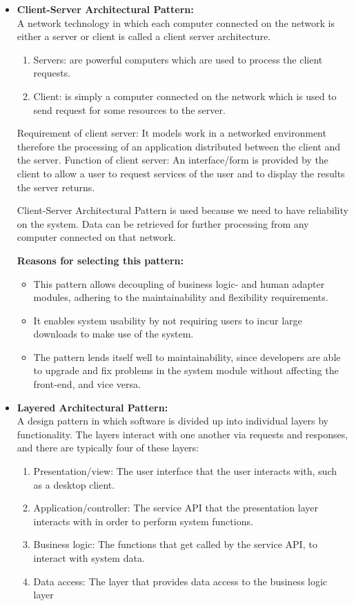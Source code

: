 \documentclass[a4paper,10pt]{article}
\begin{document}
\begin{itemize}
		\item \textbf{Client-Server Architectural Pattern:}\\
			A network technology in which each computer connected on the network is either a server or client is called a client server architecture.
			\begin{enumerate}
				\item Servers: are powerful computers which are used to process the client requests.
				\item Client: is simply a computer connected on the network which is used to send request for some resources to the server.
			\end{enumerate}
			Requirement of client server: It models work in a networked environment therefore the processing of an application distributed between the client and the server.
			Function of client server: An interface/form is provided by the client to allow a user to request services of the user and to display the results the server returns.
			
			Client-Server Architectural Pattern is used because we need to have reliability on the system. Data can be retrieved for further processing from any computer connected on that network.
		
		\subitem \textbf{Reasons for selecting this pattern:}
		\begin{itemize}
			\item This pattern allows decoupling of business logic- and human adapter modules, adhering to the maintainability and flexibility requirements.
			\item It enables system usability by not requiring users to incur large downloads to make use of the system.
			\item The pattern lends itself well to maintainability, since developers are able to upgrade and fix problems in the system module without affecting the front-end, and vice versa.
		\end{itemize}
		
		\item \textbf{Layered Architectural Pattern:}\\
		A design pattern in which software is divided up into individual layers by functionality. The layers interact with one another via requests and responses, and there are typically four of these layers:
		\begin{enumerate}
			\item Presentation/view: The user interface that the user interacts with, such as a desktop client.
			\item Application/controller: The service API that the presentation layer interacts with in order to perform system functions.
			\item Business logic: The functions that get called by the service API, to interact with system data.
			\item Data access: The layer that provides data access to the business logic layer 
		\end{enumerate}
		

\end{itemize}
\end{document}

